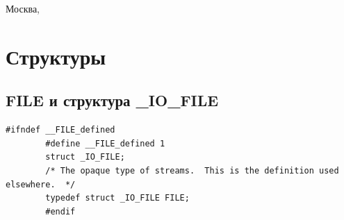 	\begin{center}
		\vfill
		Москва,~\the\year
	\end{center}
	\clearpage
	\chapter{Структуры}
	
	\section{FILE и структура \_IO\_FILE}
	
	\begin{lstlisting}[caption={FILE /libio/bits/types/FILE.h}, label={code:file}]
		#ifndef __FILE_defined
		#define __FILE_defined 1
		struct _IO_FILE;
		/* The opaque type of streams.  This is the definition used elsewhere.  */
		typedef struct _IO_FILE FILE;
		#endif
	\end{lstlisting}
	
